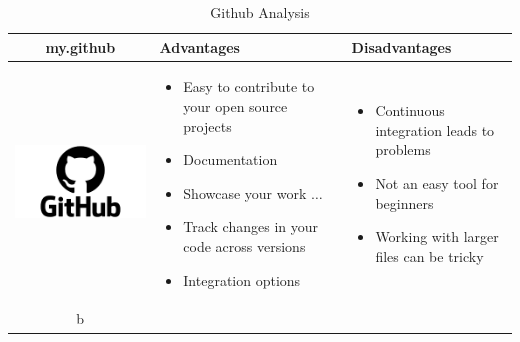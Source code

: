 \documentclass{article}
\begin{document}
	\begin{table}[h!]
		\centering
		\begin{tabular}{| c | m{5cm} | m{5cm} | }
			\hline
			my.github & Advantages & Disadvantages \\ \hline
			\begin{minipage}{.4\textwidth}
				\includegraphics[width=\linewidth, height=40mm]{github}
			\end{minipage}
		    &
		      \begin{itemize}
		      	\item Easy to contribute to your open source projects
		      	\item Documentation
		      	\item Showcase your work $\ldots$
		      	\item Track changes in your code across versions
		      	\item Integration options
		      \end{itemize}
	      &
	        \begin{itemize}
	        	\item Continuous integration leads to problems
	        	\item Not an easy tool for beginners
	        	\item Working with larger files can be tricky
	        \end{itemize}
        \\ \hline b 
		\end{tabular}
	    \caption{Github Analysis}\label{tbl:mygitHub}
	\end{table}
\end{document}
